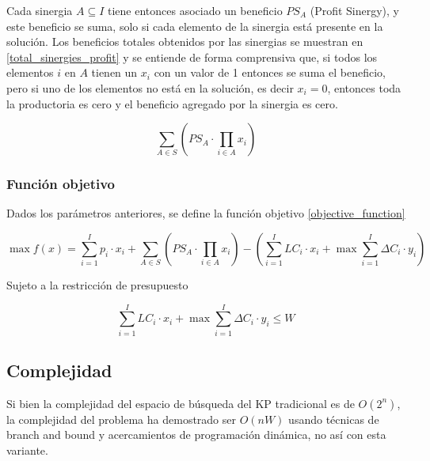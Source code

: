 \documentclass[spanish, a4paper, 12pt, twoside, openany,final]{book}
\numberwithin{equation}{section}
\begin{document}
    Cada sinergia $A \subseteq I$ tiene entonces asociado un beneficio $PS_A$ (Profit Sinergy), y este beneficio se suma, solo si cada elemento de la sinergia está presente en la solución. Los beneficios totales obtenidos por las sinergias se muestran en \ref{total_sinergies_profit} y se entiende de forma comprensiva que, si todos los elementos $i$ en $A$ tienen un $x_i$ con un valor de 1 entonces se suma el beneficio, pero si uno de los elementos no está en la solución, es decir $x_i = 0$, entonces toda la productoria es cero y el beneficio agregado por la sinergia es cero.
    
    \begin{equation}
    	\label{total_sinergies_profit}
    	\sum_{A \in S}\left( PS_A \cdot \prod_{i \in A} x_i \right)
    \end{equation}
    
    
    \subsubsection{Función objetivo}
    Dados los parámetros anteriores, se define la función objetivo \ref{objective_function}
    
    \begin{center}
    	\begin{equation}
    		\max f(x) = \sum_{i=1}^I p_i\cdot x_i + 
    		\sum_{A \in S}\left( PS_A \cdot \prod_{i \in A} x_i \right)
    		- \left( \sum_{i=1}^I LC_i\cdot x_i  + \max  \sum_{i=1}^I \Delta C_i\cdot y_i \right)
    		\label{eq:objective_function}
    	\end{equation}
    \end{center}
    
    
    Sujeto a la restricción de presupuesto
    
    \begin{equation}
    	\sum_{i=1}^I LC_i\cdot x_i  + \max \sum_{i=1}^I \Delta C_i\cdot y_i \leq W        
    \end{equation}
    
    
    \subsection{Complejidad}
    Si bien la complejidad del espacio de búsqueda del KP tradicional es de $O\left( 2^n
    \right)$, la complejidad del problema ha demostrado ser $O\left( nW\right)$ usando técnicas de branch and bound y acercamientos de programación dinámica, no así con esta variante.
    
\end{document}
